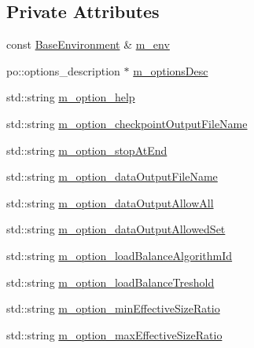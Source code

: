 \subsection*{Private Attributes}
\begin{DoxyCompactItemize}
\item 
const \hyperlink{class_q_u_e_s_o_1_1_base_environment}{Base\-Environment} \& \hyperlink{class_q_u_e_s_o_1_1_m_l_sampling_level_options_a5bdc1fb3f6eb46f73feec9c356c9a1b8}{m\-\_\-env}
\item 
po\-::options\-\_\-description $\ast$ \hyperlink{class_q_u_e_s_o_1_1_m_l_sampling_level_options_a7a3b7a94c7ae6a592f1744f19c74e2a2}{m\-\_\-options\-Desc}
\item 
std\-::string \hyperlink{class_q_u_e_s_o_1_1_m_l_sampling_level_options_a5f29394c92a49c24e9c2725320ee3406}{m\-\_\-option\-\_\-help}
\item 
std\-::string \hyperlink{class_q_u_e_s_o_1_1_m_l_sampling_level_options_ab0b21922a976c557cdcded05fcbb9a54}{m\-\_\-option\-\_\-checkpoint\-Output\-File\-Name}
\item 
std\-::string \hyperlink{class_q_u_e_s_o_1_1_m_l_sampling_level_options_a3182deb5fada9f8cc55f6335c5a65f46}{m\-\_\-option\-\_\-stop\-At\-End}
\item 
std\-::string \hyperlink{class_q_u_e_s_o_1_1_m_l_sampling_level_options_a16d8f61e3c8cf7281a8ad20af005f0c3}{m\-\_\-option\-\_\-data\-Output\-File\-Name}
\item 
std\-::string \hyperlink{class_q_u_e_s_o_1_1_m_l_sampling_level_options_a27d13c15a4e8fbb4c748a3dc127feca8}{m\-\_\-option\-\_\-data\-Output\-Allow\-All}
\item 
std\-::string \hyperlink{class_q_u_e_s_o_1_1_m_l_sampling_level_options_a9c4ef337e2c0c01cb6c8cbaa9a985f84}{m\-\_\-option\-\_\-data\-Output\-Allowed\-Set}
\item 
std\-::string \hyperlink{class_q_u_e_s_o_1_1_m_l_sampling_level_options_aad6ce1095a38c062d5f1d9ca9e215671}{m\-\_\-option\-\_\-load\-Balance\-Algorithm\-Id}
\item 
std\-::string \hyperlink{class_q_u_e_s_o_1_1_m_l_sampling_level_options_a818c93c8f5534e93b60246f9a46dbb89}{m\-\_\-option\-\_\-load\-Balance\-Treshold}
\item 
std\-::string \hyperlink{class_q_u_e_s_o_1_1_m_l_sampling_level_options_a424cb93232913921ebde9cbca932a5c1}{m\-\_\-option\-\_\-min\-Effective\-Size\-Ratio}
\item 
std\-::string \hyperlink{class_q_u_e_s_o_1_1_m_l_sampling_level_options_adbc38162386ba0751cdf09cdeefae07f}{m\-\_\-option\-\_\-max\-Effective\-Size\-Ratio}

\end{DoxyCompactItemize}
